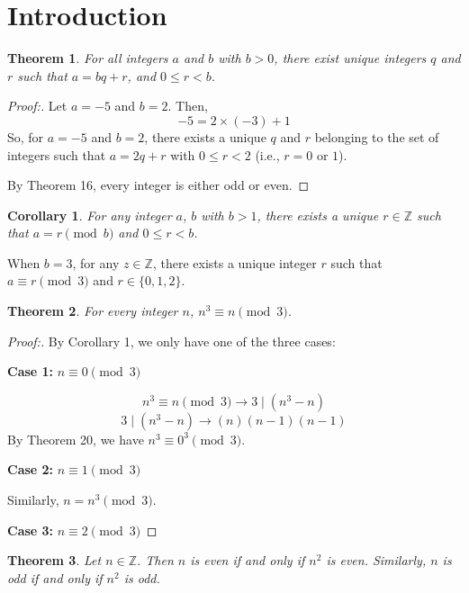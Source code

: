 \documentclass[12pt]{article}
\newtheorem{theorem}{Theorem}[section]
\newtheorem{corollary}{Corollary}[theorem]
\begin{document}
\section{Introduction}

\begin{theorem}
For all integers $a$ and $b$ with $b > 0$, there exist unique integers $q$ and $r$ such that $a = bq + r$, and $0 \leq r < b$.
\end{theorem}

\begin{proof}[Proof:]
Let $a = -5$ and $b = 2$. Then,
\[
-5 = 2 \times (-3) + 1
\]
So, for $a = -5$ and $b = 2$, there exists a unique $q$ and $r$ belonging to the set of integers such that $a = 2q + r$ with $0 \leq r < 2$ (i.e., $r = 0$ or $1$).

By Theorem 16, every integer is either odd or even.
\end{proof}

\begin{corollary}
For any integer $a$, $b$ with $b > 1$, there exists a unique $r \in \mathbb{Z}$ such that $a = r \pmod{b}$ and $0 \leq r < b$.
\end{corollary}

When $b = 3$, for any $z \in \mathbb{Z}$, there exists a unique integer $r$ such that $a \equiv r \pmod{3}$ and $r \in \{0, 1, 2\}$.

\newpage

\begin{theorem}
For every integer $n$, $n^3 \equiv n \pmod{3}$.
\end{theorem}

\begin{proof}[Proof:]
By Corollary 1, we only have one of the three cases:

\textbf{Case 1:} $n \equiv 0 \pmod{3}$

\[
n^3 \equiv n \pmod{3} \longrightarrow  3 \mid (n^3 - n)
\]
\[
3 \mid (n^3 - n) \longrightarrow (n)(n - 1)(n - 1)
\]
By Theorem 20, we have $n^3 \equiv 0^3 \pmod{3}$.

\textbf{Case 2:} $n \equiv 1 \pmod{3}$

Similarly, $n = n^3 \pmod{3}$.

\textbf{Case 3:} $n \equiv 2 \pmod{3}$

\end{proof}

\newpage

\begin{theorem}
Let $n \in \mathbb{Z}$. Then $n$ is even if and only if $n^2$ is even. Similarly, $n$ is odd if and only if $n^2$ is odd.
\end{theorem}
\end{document}

